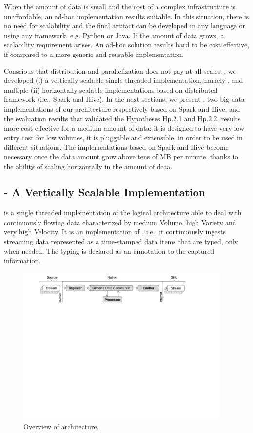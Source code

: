 When the amount of data is small and the cost of a complex infrastructure is unaffordable, an ad-hoc implementation results suitable.
In this situation, there is no need for scalability and the final artifact can be developed in any language or using any framework, e.g. Python or Java.
If the amount of data grows, a scalability requirement arises. An ad-hoc solution results hard to be cost effective, if compared to a more generic and reusable implementation. 

Conscious that distribution and parallelization does not pay at all scales~\cite{bodendistributed}, we developed (i) a vertically scalable single threaded implementation, namely \sti{}, and multiple (ii) horizontally scalable implementations based on distributed framework (i.e., Spark and Hive).
In the next sections, we present \sti{}, two big data implementations of our architecture respectively based on Spark and Hive, and the evaluation results that validated the Hypotheses \textsf{Hp.2.1} and \textsf{Hp.2.2}.
\sti{} results more cost effective for a medium amount of data: it is designed to have very low entry cost for low volumes, it is pluggable and extensible, in order to be used in different situations.
The implementations based on Spark and Hive become necessary once the data amount grow above tens of MB per minute, thanks to the ability of scaling horizontally in the amount of data.

\subsection{\sti{} - A Vertically Scalable Implementation} \label{sec:comp-mod-impl-v}
\sti{} is a single threaded implementation of the logical architecture able to deal with continuously flowing data characterized by medium Volume, high Variety and very high Velocity. It is an implementation of \river{}, i.e., it continuously ingests streaming data represented as a time-stamped data items that are typed, only when needed. The typing is declared as an annotation to the captured information.

\begin{figure}[ht]
\centering
\includegraphics[width=0.95\textwidth]{img/natron_schema}
\caption{Overview of \sti{} architecture.}
\label{fig:sti}
\end{figure} 

